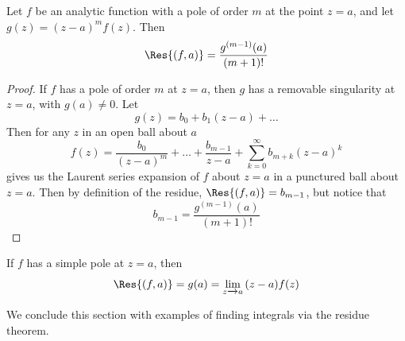 \begin{lemma}\label{5.2.2}
    Let $f$ be an analytic function with a pole of order $m$ at the point $z=a$,
    and let  $g(z)=(z-a)^mf(z)$. Then
    \begin{equation*}
        \Res{(f,a)}=\frac{g^{(m-1)}(a)}{(m+1)!}
    \end{equation*}
\end{lemma}
\begin{proof}
    If $f$ has a pole of order  $m$ at  $z=a$, then  $g$ has a removable
    singularity at  $z=a$, with  $g(a) \neq 0$. Let
    \begin{equation*}
        g(z)=b_0+b_1(z-a)+\dots
    \end{equation*}
    Then for any $z$ in an open ball about  $a$
    \begin{equation*}
        f(z)=\frac{b_0}{(z-a)^m}+\dots+\frac{b_{m-1}}{z-a}+
        \sum_{k=0}^\infty{b_{m+k}(z-a)^k}
    \end{equation*}
    gives us the Laurent series expansion of $f$ about $z=a$ in a punctured ball
    about $z=a$. Then by definition of the residue,  $\Res{(f,a)}=b_{m-1}$, but
    notice that
    \begin{equation*}
        b_{m-1}=\frac{g^{(m-1)}(a)}{(m+1)!}
    \end{equation*}
\end{proof}
\begin{corollary}
    If $f$ has a simple pole at  $z=a$, then
    \begin{equation*}
        \Res{(f,a)}=g(a)=\lim_{z \xrightarrow{} a}{(z-a)f(z)}
    \end{equation*}
\end{corollary}

We conclude this section with examples of finding integrals via the residue
theorem.

